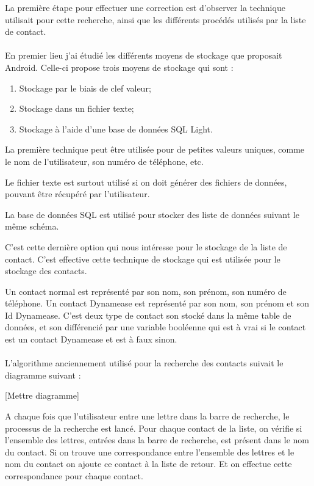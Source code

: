 La première étape pour effectuer une correction est d'observer la technique utilisait pour cette recherche, ainsi que les différents procédés utilisés par la liste de contact.\\\\



En premier lieu j'ai étudié les différents moyens de stockage que proposait Android. Celle-ci propose trois moyens de stockage qui sont :

\begin{enumerate}
	\item Stockage par le biais de clef valeur;
	\item Stockage dans un fichier texte;
	\item Stockage à l'aide d'une base de données SQL Light.
\end{enumerate}

La première technique peut être utilisée pour de petites valeurs uniques, comme le nom de l'utilisateur, son numéro de téléphone, etc.

Le fichier texte est surtout utilisé si on doit générer des fichiers de données, pouvant être récupéré par l'utilisateur.

La base de données SQL est utilisé pour stocker des liste de données suivant le même schéma.

C'est cette dernière option qui nous intéresse pour le stockage de la liste de contact. C'est effective cette technique de stockage qui est utilisée pour le stockage des contacts.

Un contact normal est représenté par son nom, son prénom, son numéro de téléphone. Un contact Dynamease est représenté par son nom, son prénom et son Id Dynamease. C'est deux type de contact son stocké dans la même table de données, et son différencié par une variable booléenne qui est à vrai si le contact est un contact Dynamease et est à faux sinon.\\\\

L'algorithme anciennement utilisé pour la recherche des contacts suivait le diagramme suivant :

[Mettre diagramme]

A chaque fois que l'utilisateur entre une lettre dans la barre de recherche, le processus de la recherche est lancé. Pour chaque contact de la liste, on vérifie si l'ensemble des lettres, entrées dans la barre de recherche, est présent dans le nom du contact. Si on trouve une correspondance entre l'ensemble des lettres et le nom du contact on ajoute ce contact à la liste de retour. Et on effectue cette correspondance pour chaque contact.

